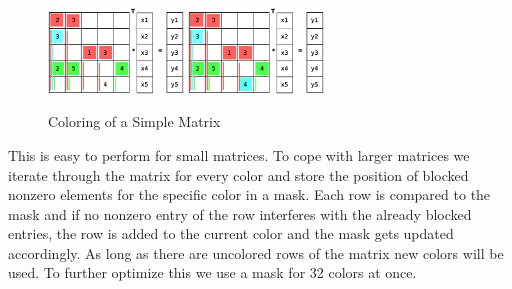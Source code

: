 \documentclass[a4paper,11pt]{scrartcl}
\begin{document}
\begin{figure}[ht]
\includegraphics[width=0.32\textwidth]{graphic/coloringT9.eps}\hfill\vline\hfill
\includegraphics[width=0.32\textwidth]{graphic/coloringT10.eps}
\caption{Coloring of a Simple Matrix}\label{figure:coloring}
\end{figure}

This is easy to perform for small matrices. To cope with larger matrices we
iterate through the matrix for every color and store the position of blocked
nonzero elements for the specific color in a mask.
Each row is compared to the mask and if no nonzero entry of the row interferes
with the already blocked entries, the row is added to the current color and the
mask gets updated accordingly.
As long as there are uncolored rows of the matrix new colors will be used.
To further optimize this we use a mask for 32 colors at once.
\end{document}
